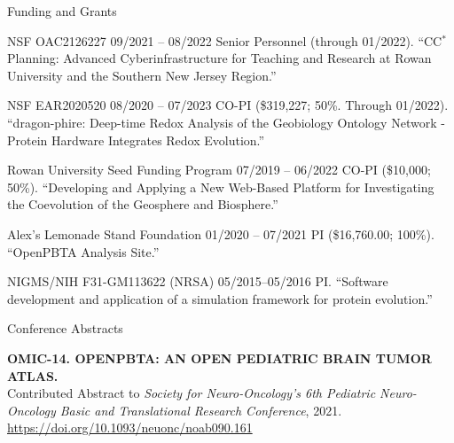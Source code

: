 \documentclass{resume} %
\begin{document}
\vspace*{0.35cm}
\begin{rSection}{Funding and Grants}
\vspace*{0.25cm}

\begin{rSubsection}
  {NSF OAC2126227}
  {09/2021 -- 08/2022}
  {Senior Personnel (through 01/2022). ``CC$^\ast$ Planning: Advanced Cyberinfrastructure for Teaching and Research at Rowan University and the Southern New Jersey Region.''}
\end{rSubsection}


\begin{rSubsection}
  {NSF EAR2020520}
  {08/2020 -- 07/2023}
  {CO-PI (\$319,227; 50\%. Through 01/2022). ``dragon-phire: Deep-time Redox Analysis of the Geobiology Ontology Network - Protein Hardware Integrates Redox Evolution.''}
\end{rSubsection}

\begin{rSubsection}
  {Rowan University Seed Funding Program}
  {07/2019 -- 06/2022}
  {CO-PI (\$10,000; 50\%). ``Developing and Applying a New Web-Based Platform for Investigating the Coevolution of the Geosphere and Biosphere.''}
\end{rSubsection}


\begin{rSubsection}
  {Alex's Lemonade Stand Foundation}
  {01/2020 -- 07/2021}
  {PI (\$16,760.00; 100\%). ``OpenPBTA Analysis Site.''}
\end{rSubsection}



\begin{rSubsection}
  {NIGMS/NIH F31-GM113622 (NRSA)}
  {05/2015--05/2016}
  {PI. ``Software development and application of a simulation framework for protein evolution.''}
\end{rSubsection}

\end{rSection}







\vspace*{0.35cm}
\begin{rSection}{Conference Abstracts}
\vspace*{0.25cm}


\textbf{OMIC-14. OPENPBTA: AN OPEN PEDIATRIC BRAIN TUMOR ATLAS.}
\\ Contributed Abstract to \emph{Society for Neuro-Oncology’s 6th Pediatric Neuro-Oncology Basic and Translational Research Conference}, 2021. \url{https://doi.org/10.1093/neuonc/noab090.161}

\end{rSection}
\end{document}
